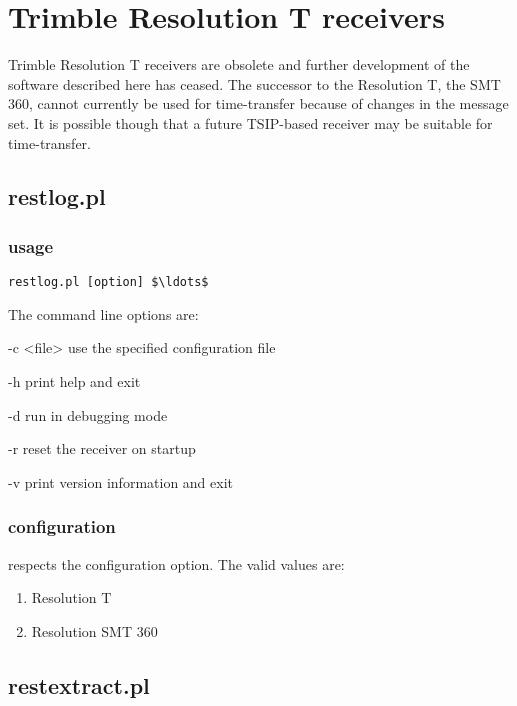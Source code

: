 \section{Trimble Resolution T receivers}

Trimble Resolution T receivers are obsolete and further development of the software
described here has ceased. The successor to the Resolution T, the SMT 360, 
cannot currently be used for time-transfer because of changes in the message set.  
It is possible though that a future TSIP-based receiver may be suitable for time-transfer.

\subsection{restlog.pl} \hypertarget{h:restlog}{}

\subsubsection{usage}

\begin{lstlisting}[mathescape=true]
restlog.pl [option] $\ldots$ 
\end{lstlisting}

The command line options are:
\begin{description*}
	\item[-c \textless{file}\textgreater] use the specified configuration file
	\item[-h] print help and exit
	\item[-d] run in debugging mode
	\item[-r] reset the receiver on startup
	\item[-v] print version information and exit
\end{description*}

\subsubsection{configuration}

 respects the  configuration option.
The valid values are:
\begin{enumerate}
	\item Resolution T
	\item Resolution SMT 360 
\end{enumerate}

\subsection{restextract.pl} \hypertarget{h:restextract}{}

